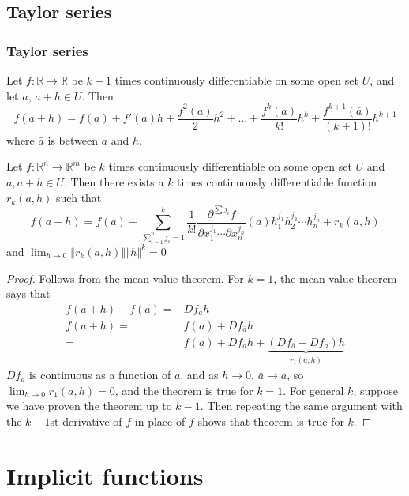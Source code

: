 \documentclass[compress]{beamer}
\def\R{\mathbb{R}}
\newcommand{\norm}[1]{\left\Vert {#1} \right\Vert}
\renewcommand{\to}{{\rightarrow}}
\begin{document}
\subsection{Taylor series}
\begin{frame}\frametitle{Taylor series}
  \begin{theorem}
    Let $f: \R \to \R$ be $k+1$ times continuously differentiable on some
    open set $U$, and let $a$, $a+h \in U$. Then 
    \[ f(a+h) = f(a) + f'(a) h + \frac{f^2(a)}{2} h^2 + ... +
    \frac{f^k(a)}{k!} h^k + \frac{f^{k+1}(\bar{a})}{(k+1)!} h^{k+1} 
    \]
    where $\bar{a}$ is between $a$ and $h$. 
  \end{theorem}
\end{frame}
\begin{frame}
  \begin{theorem}
    Let $f:\R^n \to \R^m$ be $k$ times continuously differentiable on
    some open set $U$ and $a, a+h \in U$. Then there exists a $k$ times
    continuously differentiable function $r_k(a,h)$ such that
    \[ f(a+h) = f(a) + \sum_{\sum_{i=1}^n {j_i}=1}^k\frac{1}{k!}
    \frac{\partial^{\sum j_i} f}{\partial x_{1}^{j_1} \cdots \partial
      x_{n}^{j_n}}(a) h_1^{j_1}h_2^{j_2} \cdots h_n^{j_n} +
  r_k(a,h) \]
  and $\lim_{h \to 0} \norm{r_k(a,h)}{\norm{h}^k} = 0$
  \end{theorem}
\end{frame}
\begin{frame}
  \begin{proof}
    Follows from the mean value theorem. For $k=1$, the mean value
    theorem says that
    \begin{align*}
      f(a+h) - f(a) = & Df_{\bar{a}} h \\
      f(a+h) = & f(a) + Df_{\bar{a}} h \\
      = & f(a) + Df_{a} h + \underbrace{(Df_{\bar{a}} -Df_a)h}_{r_1(a,h)}  
    \end{align*}
    $Df_a$ is continuous as a function of $a$, and as $h \to 0$,
    $\bar{a} \to a$, so $\lim_{h \to 0} r_1(a,h) = 0$, and the theorem
    is true for $k = 1$. For general $k$, suppose we have proven the
    theorem up to $k-1$. Then repeating the same argument with the
    $k-1$st derivative of $f$ in place of $f$ shows that theorem is true
    for $k$. 
  \end{proof}
\end{frame}

\section{Implicit functions}
\end{document}
